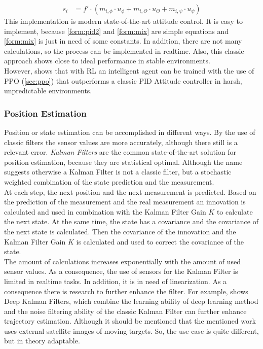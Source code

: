 \begin{align}
	s_i &= f' \cdot (m_{i,\phi} \cdot u_{\phi} + m_{i, \Theta} \cdot u_{\Theta} + m_{i,\psi} \cdot u_{\psi}) \label{form:mix}
\end{align}
\newline
This implementation is modern state-of-the-art attitude control. It is easy to implement, 
because \cref{form:pid2} and \cref{form:mix} are simple equations and \cref{form:mix} is just in need of some constants. 
In addition, there are not many calculations, so the process can be implemented in realtime. 
Also, this classic approach shows close to ideal performance in stable environments.\\
However, \cite{koch2019reinforcement} shows that with RL an intelligent agent can be trained with the use of PPO (\cref{sec:ppo}) 
that outperforms a classic PID Attitude controller in harsh, unpredictable environments. 

\newpage

\subsubsection{Position Estimation}
Position or state estimation can be accomplished in different ways. 
By the use of classic filters the sensor values are more accurately, although there still is a relevant error. 
\emph{Kalman Filters} are the common state-of-the-art solution for position estimation, because they are statistical optimal. 
Although the name suggests otherwise a Kalman Filter is not a classic filter, but a stochastic weighted combination of the state prediction and the measurement. \\
At each step, the next position and the next measurement is predicted. 
Based on the prediction of the measurement and the real measurement an innovation is calculated and used in combination with the Kalman Filter Gain $K$ 
to calculate the next state. 
At the same time, the state has a covariance and the covariance of the next state is calculated. 
Then the covariance of the innovation and the Kalman Filter Gain $K$ is calculated and used to correct the covariance of the state.\\
The amount of calculations increases exponentially with the amount of used sensor values. As a consequence,
the use of sensors for the Kalman Filter is limited in realtime tasks. 
In addition, it is in need of linearization. As a consequence there is research to further enhance the filter.
For example, \cite{shi2022deep} shows Deep Kalman Filters, 
which combine the learning ability of deep learning method and the noise filtering ability of the classic Kalman Filter can further enhance trajectory estimation. 
Although it should be mentioned that the mentioned work uses external satellite images of moving targets. So, the use case is quite different, but in theory adaptable. 

